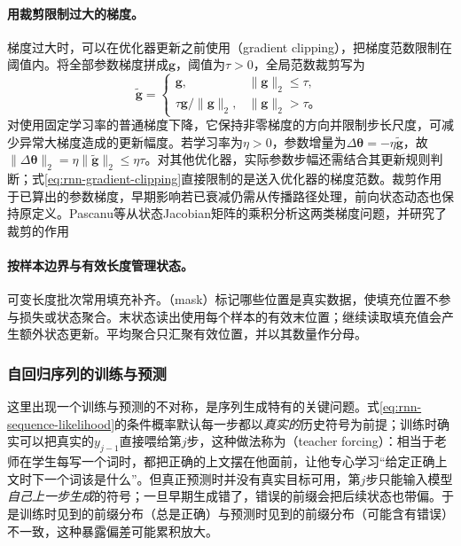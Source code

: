 \paragraph{用裁剪限制过大的梯度。}

梯度过大时，可以在优化器更新之前使用（gradient clipping），把梯度范数限制在阈值内。将全部参数梯度拼成$\bm{g}$，阈值为$\tau>0$，全局范数裁剪写为
\begin{equation}
  \widetilde{\bm{g}}=
  \begin{cases}
    \bm{g},&\lVert\bm{g}\rVert_2\leq\tau,\\
    \tau\bm{g}/\lVert\bm{g}\rVert_2,&\lVert\bm{g}\rVert_2>\tau\text{。}
  \end{cases}
  \label{eq:rnn-gradient-clipping}
\end{equation}
对使用固定学习率的普通梯度下降，它保持非零梯度的方向并限制步长尺度，可减少异常大梯度造成的更新幅度。若学习率为$\eta>0$，参数增量为$\Delta\bm{\theta}=-\eta\widetilde{\bm{g}}$，故$\lVert\Delta\bm{\theta}\rVert_2=\eta\lVert\widetilde{\bm{g}}\rVert_2\leq\eta\tau$。对其他优化器，实际参数步幅还需结合其更新规则判断；式\eqref{eq:rnn-gradient-clipping}直接限制的是送入优化器的梯度范数。裁剪作用于已算出的参数梯度，早期影响若已衰减仍需从传播路径处理，前向状态动态也保持原定义。Pascanu等从状态Jacobian矩阵的乘积分析这两类梯度问题，并研究了裁剪的作用

\paragraph{按样本边界与有效长度管理状态。}

可变长度批次常用填充补齐。（mask）标记哪些位置是真实数据，使填充位置不参与损失或状态聚合。末状态读出使用每个样本的有效末位置；继续读取填充值会产生额外状态更新。平均聚合只汇聚有效位置，并以其数量作分母。

\subsubsection{自回归序列的训练与预测}
\label{sec:rnn-teacher-forcing}

这里出现一个训练与预测的不对称，是序列生成特有的关键问题。式\eqref{eq:rnn-sequence-likelihood}的条件概率默认每一步都以\emph{真实的}历史符号为前提；训练时确实可以把真实的$y_{j-1}$直接喂给第$j$步，这种做法称为（teacher forcing）：相当于老师在学生每写一个词时，都把正确的上文摆在他面前，让他专心学习“给定正确上文时下一个词该是什么”。但真正预测时并没有真实目标可用，第$j$步只能输入模型\emph{自己上一步生成}的符号；一旦早期生成错了，错误的前缀会把后续状态也带偏。于是训练时见到的前缀分布（总是正确）与预测时见到的前缀分布（可能含有错误）不一致，这种暴露偏差可能累积放大。

